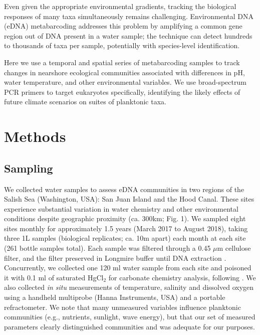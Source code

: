 \documentclass[11pt]{article}
\begin{document}
\begin{linenumbers}
Even given the appropriate environmental gradients, tracking the biological responses of many taxa simultaneously remains challenging. Environmental DNA (eDNA) metabarcoding \cite{holman2019detection, kelly2016genetic} addresses this problem by amplifying a common gene region out of DNA present in a water sample; the technique can detect hundreds to thousands of taxa per sample, potentially with species-level identification. 



Here we use a temporal and spatial series of metabarcoding samples to track changes in nearshore ecological communities associated with differences in pH, water temperature, and other environmental variables. We use broad-spectrum PCR primers \cite{leray_new_2013} to target eukaryotes specifically, identifying the likely effects of future climate scenarios on suites of planktonic taxa. 

\section{Methods}

\subsection*{Sampling}
We collected water samples to assess eDNA communities in two regions of the Salish Sea (Washington, USA): San Juan Island and the Hood Canal. These sites experience substantial variation in water chemistry and other environmental conditions despite geographic proximity (ca. 300km; Fig. 1). We sampled eight sites monthly for approximately 1.5 years (March 2017 to August 2018), taking three 1L samples (biological replicates; ca. 10m apart) each month at each site (261 bottle samples total). Each sample was filtered through a 0.45 $\mu$m  cellulose filter, and the filter preserved in Longmire buffer until DNA extraction \cite{renshaw2015room}. Concurrently, we collected one 120 ml water sample from each site and poisoned it with 0.1 ml of saturated HgCl$_2$ for carbonate chemistry analysis, following \cite{riebesell2011guide}. We also collected \textit{in situ} measurements of temperature, salinity and dissolved oxygen using a handheld multiprobe (Hanna Instruments, USA) and a portable refractometer. We note that many unmeasured variables influence planktonic communities (e.g., nutrients, sunlight, wave energy), but that our set of measured parameters clearly distinguished communities and was adequate for our purposes.
  

\end{linenumbers}
\end{document}
